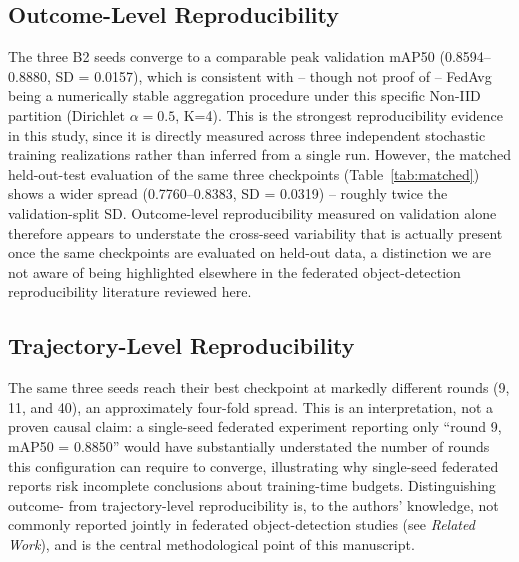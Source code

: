 \documentclass[11pt]{article}
\begin{document}
\subsection*{Outcome-Level Reproducibility}
The three B2 seeds converge to a comparable peak validation mAP50 (0.8594--0.8880, SD = 0.0157), which is consistent with -- though not proof of -- FedAvg being a numerically stable aggregation procedure under this specific Non-IID partition (Dirichlet $\alpha=0.5$, K=4). This is the strongest reproducibility evidence in this study, since it is directly measured across three independent stochastic training realizations rather than inferred from a single run. However, the matched held-out-test evaluation of the same three checkpoints (Table~\ref{tab:matched}) shows a wider spread (0.7760--0.8383, SD = 0.0319) -- roughly twice the validation-split SD. Outcome-level reproducibility measured on validation alone therefore appears to understate the cross-seed variability that is actually present once the same checkpoints are evaluated on held-out data, a distinction we are not aware of being highlighted elsewhere in the federated object-detection reproducibility literature reviewed here.

\subsection*{Trajectory-Level Reproducibility}
The same three seeds reach their best checkpoint at markedly different rounds (9, 11, and 40), an approximately four-fold spread. This is an interpretation, not a proven causal claim: a single-seed federated experiment reporting only ``round 9, mAP50 = 0.8850'' would have substantially understated the number of rounds this configuration can require to converge, illustrating why single-seed federated reports risk incomplete conclusions about training-time budgets. Distinguishing outcome- from trajectory-level reproducibility is, to the authors' knowledge, not commonly reported jointly in federated object-detection studies (see \emph{Related Work}), and is the central methodological point of this manuscript.
\end{document}
